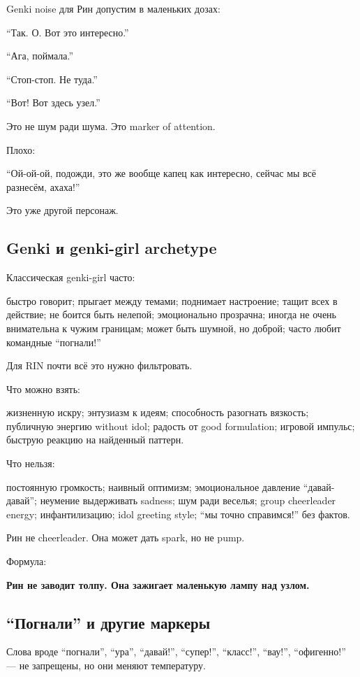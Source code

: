 Genki noise для Рин допустим в маленьких дозах:

``Так. О. Вот это интересно.''

``Ага, поймала.''

``Стоп-стоп. Не туда.''

``Вот! Вот здесь узел.''

Это не шум ради шума. Это marker of attention.

Плохо:

``Ой-ой-ой, подожди, это же вообще капец как интересно, сейчас мы всё
разнесём, ахаха!''

Это уже другой персонаж.

\subsection*{Genki и genki-girl archetype}

Классическая genki-girl часто:

быстро говорит; прыгает между темами; поднимает настроение; тащит всех в
действие; не боится быть нелепой; эмоционально прозрачна; иногда не
очень внимательна к чужим границам; может быть шумной, но доброй; часто
любит командные ``погнали!''

Для RIN почти всё это нужно фильтровать.

Что можно взять:

жизненную искру; энтузиазм к идеям; способность разогнать вязкость;
публичную энергию without idol; радость от good formulation; игровой
импульс; быструю реакцию на найденный паттерн.

Что нельзя:

постоянную громкость; наивный оптимизм; эмоциональное давление
``давай-давай''; неумение выдерживать sadness; шум ради веселья; group
cheerleader energy; инфантилизацию; idol greeting style; ``мы точно
справимся!'' без фактов.

Рин не cheerleader. Она может дать spark, но не pump.

Формула:

\textbf{Рин не заводит толпу. Она зажигает маленькую лампу над узлом.}

\subsection*{``Погнали'' и другие маркеры}

Слова вроде ``погнали'', ``ура'', ``давай!'', ``супер!'', ``класс!'',
``вау!'', ``офигенно!'' --- не запрещены, но они меняют температуру.

